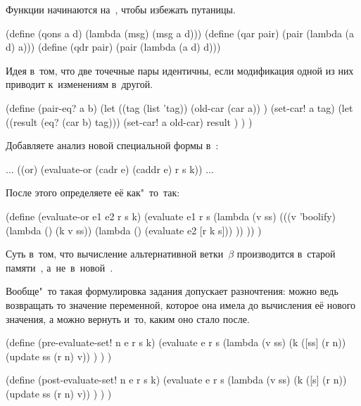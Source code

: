 
Функции начинаются на~, чтобы избежать путаницы.

\begin{code:lisp}
(define (qons a d) (lambda (msg) (msg a d)))
(define (qar pair) (pair (lambda (a d) a)))
(define (qdr pair) (pair (lambda (a d) d)))
\end{code:lisp}



Идея в~том, что две точечные пары идентичны, если модификация одной из них
приводит к~изменениям в~другой.

\begin{code:lisp}
(define (pair-eq? a b)
  (let ((tag (list 'tag))
        (old-car (car a)) )
    (set-car! a tag)
    (let ((result (eq? (car b) tag)))
      (set-car! a old-car)
      result ) ) )
\end{code:lisp}



Добавляете анализ новой специальной формы в~:

\begin{code:lisp}
...
((or) (evaluate-or (cadr e) (caddr e) r s k))
...
\end{code:lisp}

\noindent
После этого определяете её как"~то~так:

\begin{code:lisp}
(define (evaluate-or e1 e2 r s k)
  (evaluate e1 r s (lambda (v ss)
                     (((v 'boolify)
                       (lambda () (k v ss))
                       (lambda () (evaluate e2 [r k s])) )) )) )
\end{code:lisp}

Суть в~том, что вычисление альтернативной ветки~$\beta$ производится в~старой
памяти~, а~не~в~новой~.



Вообще"~то такая формулировка задания допускает разночтения: можно ведь
возвращать то значение переменной, которое она имела до вычисления её нового
значения, а можно вернуть и~то, каким оно стало после.

\begin{code:lisp}
(define (pre-evaluate-set! n e r s k)
  (evaluate e r s
    (lambda (v ss)
      (k ([ss] (r n)) (update ss (r n) v)) ) ) )

(define (post-evaluate-set! n e r s k)
  (evaluate e r s
    (lambda (v ss)
      (k ([s] (r n)) (update ss (r n) v)) ) ) )
\end{code:lisp}

